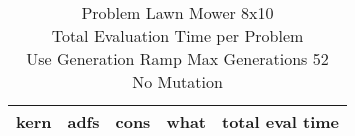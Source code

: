 \begin{table}[H]
\caption{Problem  Lawn Mower 8x10\\Total Evaluation Time per Problem \\ Use Generation Ramp  Max Generations 52\\ No Mutation \\}
\begin{center}
\scalebox{1.0} %
{
\begin{tabular}{llllr}
\hline
kern & adfs & cons & what & total eval time \\
\hline


\end{tabular}
}
\end{center}
\end{table}

